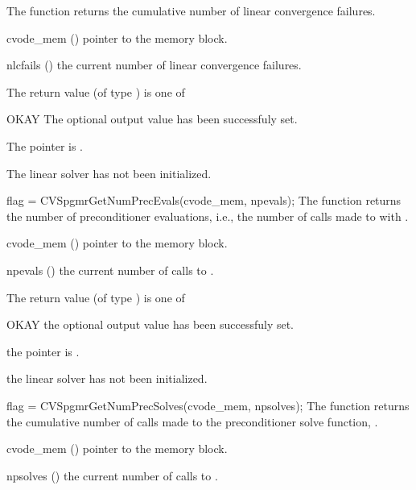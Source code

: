 {
  The function  returns the
  cumulative number of linear convergence failures.
}
{
  \begin{args}
  \item[cvode\_mem] ()
    pointer to the {\cvode} memory block.
  \item[nlcfails] ()
    the current number of linear convergence failures.
  \end{args}
}
{
  The return value  (of type ) is one of
  \begin{args}
  \item[OKAY] 
    The optional output value has been successfuly set.
  \item[\Id{LIN\_NO\_MEM}]
    The  pointer is .
  \item[\Id{LIN\_NO\_LMEM}]
    The {\cvspgmr} linear solver has not been initialized.
  \end{args}
}
{}
{
  flag = CVSpgmrGetNumPrecEvals(cvode\_mem, npevals);
}
{
  The function  returns the
  number of preconditioner evaluations, i.e., the number of 
  calls made to  with .
}
{
  \begin{args}
  \item[cvode\_mem] ()
    pointer to the {\cvode} memory block.
  \item[npevals] ()
    the current number of calls to .
  \end{args}
}
{
  The return value  (of type ) is one of
  \begin{args}
  \item[OKAY] 
    the optional output value has been successfuly set.
  \item[\Id{LIN\_NO\_MEM}]
    the  pointer is .
  \item[\Id{LIN\_NO\_LMEM}]
    the {\cvspgmr} linear solver has not been initialized.
  \end{args}
}
{}
{
  flag = CVSpgmrGetNumPrecSolves(cvode\_mem, npsolves);
}
{
  The function  returns the
  cumulative number of calls made to the preconditioner 
  solve function, .
}
{
  \begin{args}
  \item[cvode\_mem] ()
    pointer to the {\cvode} memory block.
  \item[npsolves] ()
    the current number of calls to .
  \end{args}
}

